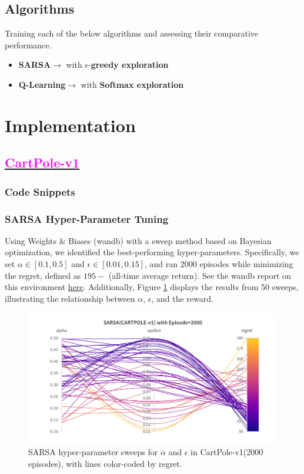 \documentclass[11pt, a4]{article}
\begin{document}
		\subsection{Algorithms}
		Training each of the below algorithms and assessing their comparative performance.
		\begin{itemize}
			\item \textbf{SARSA}$\rightarrow$ with $\epsilon$-\textbf{greedy exploration}
			\item \textbf{Q-Learning}$\rightarrow$ with \textbf{Softmax exploration}
		\end{itemize}
	\section{Implementation}
		\subsection{\href{https://github.com/RitabrataMandal/RL-DA6400-assignment_1/tree/main/cartpole-v1}{\textcolor{magenta}{CartPole-v1}}}
			\subsubsection{Code Snippets}
%				
			\subsubsection{SARSA Hyper-Parameter Tuning}  
			Using Weights \& Biases (wandb) with a sweep method based on Bayesian optimization, we identified the best-performing hyper-parameters. Specifically, we set $\alpha \in [0.1, 0.5]$ and $\epsilon \in [0.01, 0.15]$, and ran 2000 episodes while minimizing the regret, defined as \(195 -\) (all-time average return). See the wandb report on this environment \href{https://api.wandb.ai/links/ee24e009-iitm/0hseqrps}{here}. Additionally, Figure \ref{fig:sarsacartpole} displays the results from 50 sweeps, illustrating the relationship between $\alpha$, $\epsilon$, and the reward.
				\begin{figure}[h]
					\centering
					\includegraphics[width=1\linewidth]{sarsa-hyp-tuning-cartpole.png}
					\caption{SARSA hyper-parameter sweeps for $\alpha$ and $\epsilon$ in CartPole-v1(2000 episodes), with lines color-coded by regret.}
					\label{fig:sarsacartpole}
				\end{figure}
\end{document}

